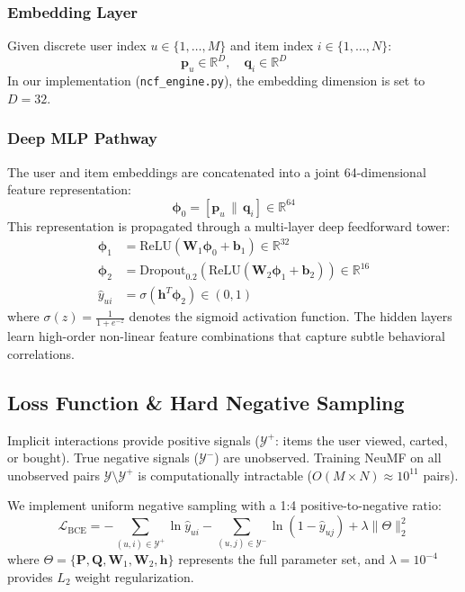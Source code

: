 \documentclass[11pt,a4paper]{article}
\begin{document}
\subsubsection{Embedding Layer}
Given discrete user index $u \in \{1, \dots, M\}$ and item index $i \in \{1, \dots, N\}$:
\begin{equation}
    \mathbf{p}_u \in \mathbb{R}^D, \quad \mathbf{q}_i \in \mathbb{R}^D
\end{equation}
In our implementation (\texttt{ncf\_engine.py}), the embedding dimension is set to $D = 32$.

\subsubsection{Deep MLP Pathway}
The user and item embeddings are concatenated into a joint 64-dimensional feature representation:
\begin{equation}
    \boldsymbol{\phi}_0 = [\mathbf{p}_u \,\|\, \mathbf{q}_i] \in \mathbb{R}^{64}
\end{equation}
This representation is propagated through a multi-layer deep feedforward tower:
\begin{align}
    \boldsymbol{\phi}_1 &= \text{ReLU}\left(\mathbf{W}_1 \boldsymbol{\phi}_0 + \mathbf{b}_1\right) \in \mathbb{R}^{32} \\
    \boldsymbol{\phi}_2 &= \text{Dropout}_{0.2}\left(\text{ReLU}\left(\mathbf{W}_2 \boldsymbol{\phi}_1 + \mathbf{b}_2\right)\right) \in \mathbb{R}^{16} \\
    \hat{y}_{ui} &= \sigma\left(\mathbf{h}^T \boldsymbol{\phi}_2\right) \in (0, 1)
\end{align}
where $\sigma(z) = \frac{1}{1 + e^{-z}}$ denotes the sigmoid activation function. The hidden layers learn high-order non-linear feature combinations that capture subtle behavioral correlations.

\subsection{Loss Function \& Hard Negative Sampling}
Implicit interactions provide positive signals ($\mathcal{Y}^+$: items the user viewed, carted, or bought). True negative signals ($\mathcal{Y}^-$) are unobserved. Training NeuMF on all unobserved pairs $\mathcal{Y} \setminus \mathcal{Y}^+$ is computationally intractable ($O(M \times N) \approx 10^{11}$ pairs).

We implement uniform negative sampling with a 1:4 positive-to-negative ratio:
\begin{equation}
    \mathcal{L}_{\text{BCE}} = -\sum_{(u, i) \in \mathcal{Y}^+} \ln \hat{y}_{ui} - \sum_{(u, j) \in \mathcal{Y}^-} \ln (1 - \hat{y}_{uj}) + \lambda \|\Theta\|_2^2
\end{equation}
where $\Theta = \{\mathbf{P}, \mathbf{Q}, \mathbf{W}_1, \mathbf{W}_2, \mathbf{h}\}$ represents the full parameter set, and $\lambda = 10^{-4}$ provides $L_2$ weight regularization.
\end{document}
